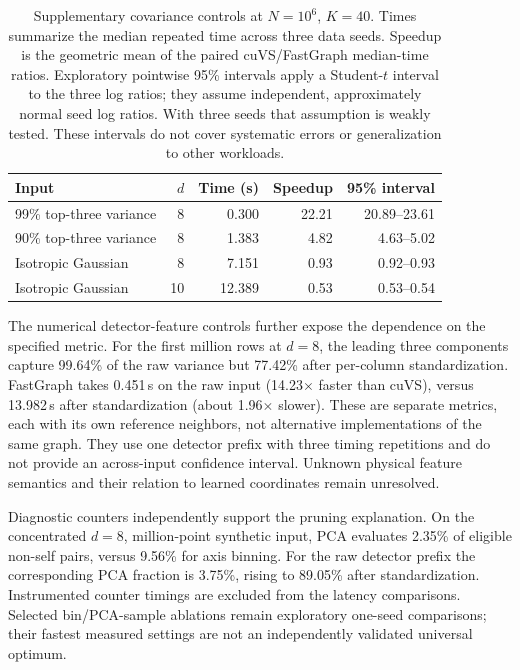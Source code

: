 \documentclass[final,3p,11pt]{elsarticle}
\begin{document}
\begin{table}[!htbp]
\centering
\caption{Supplementary covariance controls at $N{=}10^6$, $K{=}40$.
Times summarize the median repeated time across three data seeds. Speedup
is the geometric mean of the paired cuVS/FastGraph median-time ratios.
Exploratory pointwise 95\% intervals apply a Student-$t$ interval to the
three log ratios; they assume independent, approximately normal seed log
ratios. With three seeds that assumption is weakly tested. These intervals
do not cover systematic errors or generalization to other workloads.}
\label{tab:covariance-controls}
\small
\begin{tabular}{lrrrr}
\toprule
Input & $d$ & Time (s) & Speedup & 95\% interval \\
\midrule
99\% top-three variance & 8 & 0.300 & 22.21 & 20.89--23.61 \\
90\% top-three variance & 8 & 1.383 & 4.82 & 4.63--5.02 \\
Isotropic Gaussian & 8 & 7.151 & 0.93 & 0.92--0.93 \\
Isotropic Gaussian & 10 & 12.389 & 0.53 & 0.53--0.54 \\
\bottomrule
\end{tabular}
\end{table}

The numerical detector-feature controls further expose the dependence on
the specified metric. For the first million rows at $d{=}8$, the leading
three components capture 99.64\% of the raw variance but 77.42\% after
per-column standardization. FastGraph takes 0.451\,s on the raw input
(14.23$\times$ faster than cuVS), versus 13.982\,s after standardization
(about 1.96$\times$ slower). These are separate metrics, each with its own
reference neighbors, not alternative implementations of the same graph.
They use one detector prefix with three timing repetitions and do not
provide an across-input confidence interval. Unknown physical feature
semantics and their relation to learned coordinates remain unresolved.

Diagnostic counters independently support the pruning explanation.
On the concentrated $d{=}8$, million-point synthetic input, PCA evaluates
2.35\% of eligible non-self pairs, versus 9.56\% for axis binning.
For the raw detector prefix the corresponding PCA fraction is 3.75\%,
rising to 89.05\% after standardization. Instrumented counter timings are
excluded from the latency comparisons. Selected bin/PCA-sample ablations
remain exploratory one-seed comparisons; their fastest measured settings
are not an independently validated universal optimum.
\end{document}
